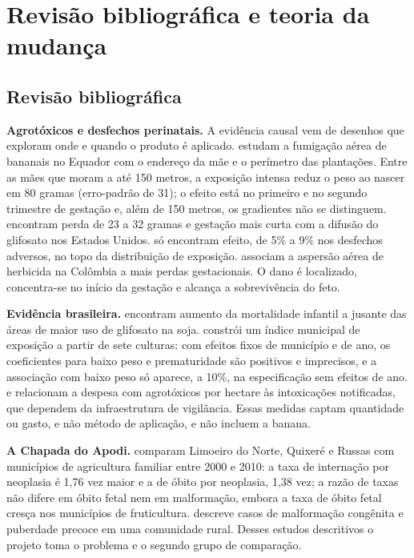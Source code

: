 \chapter{Revisão bibliográfica e teoria da mudança}
\label{sec:literatura}

\section{Revisão bibliográfica}

\textbf{Agrotóxicos e desfechos perinatais.} A evidência causal vem de
desenhos que exploram onde e quando o produto é aplicado.
 estudam a fumigação aérea de bananais no
Equador com o endereço da mãe e o perímetro das plantações. Entre as mães que moram a até 150 metros, a
exposição intensa reduz o peso ao nascer em 80 gramas (erro-padrão de 31); o
efeito está no primeiro e no segundo trimestre de gestação e, além de 150
metros, os gradientes não se distinguem.
 encontram perda de 23 a 32 gramas e
gestação mais curta com a difusão do glifosato nos Estados Unidos.
 só encontram efeito, de 5\% a 9\% nos
desfechos adversos, no topo da distribuição de exposição.
 associam a aspersão aérea de herbicida na
Colômbia a mais perdas gestacionais. O dano é localizado, concentra-se no
início da gestação e alcança a sobrevivência do feto.

\textbf{Evidência brasileira.}  encontram aumento da
mortalidade infantil a jusante das áreas de maior uso de glifosato na soja.
 constrói um índice municipal de exposição a partir de
sete culturas: com efeitos fixos de município e de ano, os coeficientes para
baixo peso e prematuridade são positivos e imprecisos, e a associação com
baixo peso só aparece, a 10\%, na especificação sem efeitos de ano.
 e 
relacionam a despesa com agrotóxicos por hectare às intoxicações notificadas,
que dependem da infraestrutura de vigilância. Essas medidas captam quantidade
ou gasto, e não método de aplicação, e não incluem a banana.

\textbf{A Chapada do Apodi.}  comparam Limoeiro
do Norte, Quixeré e Russas com municípios de agricultura familiar entre 2000 e
2010: a taxa de internação por neoplasia é 1,76 vez maior e a de óbito por
neoplasia, 1,38 vez; a razão de taxas não difere em óbito fetal nem em
malformação, embora a taxa de óbito fetal cresça nos municípios de
fruticultura.  descreve casos de malformação congênita
e puberdade precoce em uma comunidade rural. Desses estudos
descritivos o projeto toma o problema e o segundo grupo de comparação.

